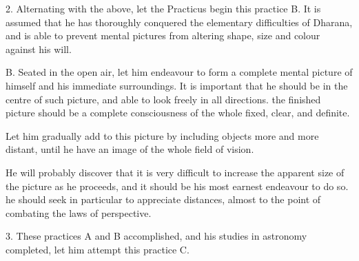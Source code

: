 2. Alternating with the above, let the Practicus begin this practice B. It is assumed that he has thoroughly conquered the elementary difficulties of Dharana, and is able to prevent mental pictures from altering shape, size and colour against his will.


\begin{quoting}

B. Seated in the open air, let him endeavour to form a complete mental picture of himself and his immediate surroundings. It is important that he should be in the centre of such picture, and able to look freely in all directions. the finished picture should be a complete consciousness of the whole fixed, clear, and definite.

Let him gradually add to this picture by including objects more and more distant, until he have an image of the whole field of vision.

He will probably discover that it is very difficult to increase the apparent size of the picture as he proceeds, and it should be his most earnest endeavour to do so. he should seek in particular to appreciate distances, almost to the point of combating the laws of perspective.

\end{quoting}


3. These practices A and B accomplished, and his studies in astronomy completed, let him attempt this practice C.


